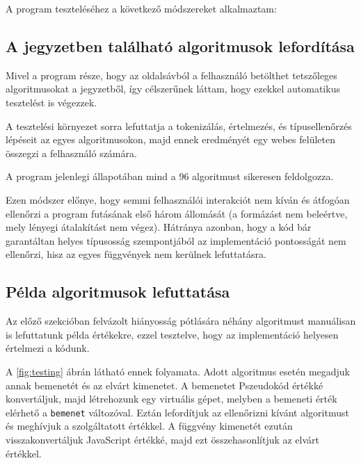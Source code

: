 A program teszteléséhez a következő módszereket alkalmaztam:

\subsection{A jegyzetben található algoritmusok lefordítása}

Mivel a program része, hogy az oldalsávból a felhasználó betölthet tetszőleges algoritmusokat a jegyzetből, így célszerűnek láttam, hogy ezekkel automatikus tesztelést is végezzek.

A tesztelési környezet sorra lefuttatja a tokenizálás, értelmezés, és típusellenőrzés lépéseit az egyes algoritmusokon, majd ennek eredményét egy webes felületen összegzi a felhasználó számára.

A program jelenlegi állapotában mind a 96 algoritmust sikeresen feldolgozza.

Ezen módszer előnye, hogy semmi felhasználói interakciót nem kíván és átfogóan ellenőrzi a program futásának első három állomását (a formázást nem beleértve, mely lényegi átalakítást nem végez). Hátránya azonban, hogy a kód bár garantáltan helyes típusosság szempontjából az implementáció pontosságát nem ellenőrzi, hisz az egyes függvények nem kerülnek lefuttatásra.

\subsection{Példa algoritmusok lefuttatása}

Az előző szekcióban felvázolt hiányosság pótlására néhány algoritmust manuálisan is lefuttatunk példa értékekre, ezzel tesztelve, hogy az implementáció helyesen értelmezi a kódunk.


A \ref{fig:testing} ábrán látható ennek folyamata. Adott algoritmus esetén megadjuk annak bemenetét és az elvárt kimenetet. A bemenetet Pszeudokód értékké konvertáljuk, majd létrehozunk egy virtuális gépet, melyben a bemeneti érték elérhető a \texttt{bemenet} változóval. Eztán lefordítjuk az ellenőrizni kívánt algoritmust és meghívjuk a szolgáltatott értékkel. A függvény kimenetét ezután visszakonvertáljuk JavaScript értékké, majd ezt összehasonlítjuk az elvárt értékkel.